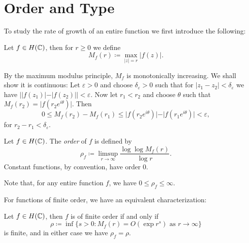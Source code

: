 \section{Order and Type}
\label{sec:order-type}

To study the rate of growth of an entire function we first introduce the following:
\begin{definition}
    Let $f \in H(\mathbb{C})$, then for $r \geq 0$ we define
    \begin{equation*}
        M_f(r) \coloneqq \max_{\vert z \vert = r} \vert f(z) \vert.
    \end{equation*}
\end{definition}

By the maximum modulus principle, $M_f$ is monotonically increasing. We shall show it is continuous: Let $\varepsilon > 0$ and choose $\delta_\varepsilon > 0$ such that for ${\vert z_1 - z_2 \vert < \delta_\varepsilon}$ we have ${\left\vert \vert f(z_1) \vert - \vert f(z_2) \vert \right\vert < \varepsilon}$. Now let $r_1 < r_2$ and choose $\theta$ such that $M_f(r_2) = \vert f(r_2 e^{i \theta}) \vert$. Then
\begin{equation*}
    0 \leq M_f(r_2) - M_f(r_1) \leq \vert f(r_2 e^{i \theta}) \vert - \vert f(r_1 e^{i \theta}) \vert < \varepsilon,
\end{equation*}
for $r_2 - r_1 < \delta_\varepsilon$.

\begin{definition} \label{def:order}
    Let $f \in H(\mathbb{C})$. The \emph{order} of $f$ is defined by
    \begin{equation} \label{eq:def-order}
        \rho_f \coloneqq \limsup_{r \to \infty} \frac{\log \log M_f(r)}{\log r}.
    \end{equation}
    Constant functions, by convention, have order 0.
\end{definition}

Note that, for any entire function $f$, we have $0 \leq \rho_f \leq \infty$.

For functions of finite order, we have an equivalent characterization:

\begin{proposition} \label{prop:order-infimum}
    Let $f \in H(\mathbb{C})$, then $f$ is of finite order if and only if
    \begin{equation}
        \rho \coloneqq \inf \{ s > 0 : M_f(r) = O(\exp r^s) \textrm{ as } r \to \infty \}
    \end{equation}
    is finite, and in either case we have $\rho_f = \rho$.
\end{proposition}

